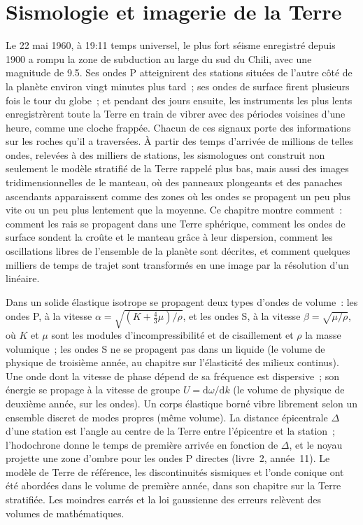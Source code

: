 \chapter{Sismologie et imagerie de la Terre}\label{ch:b3:seismology-imaging}

Le 22 mai 1960, à 19:11 temps universel, le plus fort séisme enregistré depuis
1900 a rompu la zone de subduction au large du sud du Chili, avec une magnitude de 9.5.
Ses ondes P atteignirent des stations situées de l'autre côté de la planète environ vingt minutes
plus tard~; ses ondes de surface firent plusieurs fois le tour du globe~; et pendant des jours
ensuite, les instruments les plus lents enregistrèrent toute la Terre en train de vibrer avec
des périodes voisines d'une heure, comme une cloche frappée. Chacun de ces signaux porte
des informations sur les roches qu'il a traversées. À partir des temps d'arrivée de millions de
telles ondes, relevées à des milliers de stations, les sismologues ont construit non seulement
le modèle stratifié de la Terre rappelé plus bas, mais aussi des images tridimensionnelles de
le manteau, où des panneaux plongeants et des panaches ascendants apparaissent comme des zones où
les ondes se propagent un peu plus vite ou un peu plus lentement que la moyenne. Ce chapitre montre comment~:
comment les rais se propagent dans une Terre sphérique, comment les ondes de surface sondent la croûte
et le manteau grâce à leur dispersion, comment les oscillations libres de l'ensemble de la
planète sont décrites, et comment quelques milliers de temps de trajet sont transformés en une
image par la résolution d'un  linéaire.

\begin{recall}
Dans un solide élastique isotrope se propagent deux types d'ondes de volume~: les ondes P, à la
vitesse $\alpha = \sqrt{(K + \tfrac43\mu)/\rho}$, et les ondes S, à la
vitesse $\beta = \sqrt{\mu/\rho}$, où $K$ et $\mu$ sont les modules d'incompressibilité et de cisaillement
et $\rho$ la masse volumique~; les ondes S ne se propagent pas dans un liquide (le volume de physique
de troisième année, au chapitre sur l'élasticité des milieux continus). Une onde dont la vitesse de phase
dépend de sa fréquence est dispersive~; son énergie se propage à la
vitesse de groupe $U = \mathrm d\omega/\mathrm dk$ (le volume de physique de deuxième année, sur les
ondes). Un corps élastique borné vibre librement selon un ensemble discret de modes
propres (même volume). La distance épicentrale $\Delta$ d'une station est l'angle
au centre de la Terre entre l'épicentre et la station~; l'hodochrone
donne le temps de première arrivée en fonction de $\Delta$, et le noyau projette une
zone d'ombre pour les ondes P directes (livre~2, année~11). Le modèle de Terre de référence,
les discontinuités sismiques et l'onde conique ont été abordées dans le volume de première année,
dans son chapitre sur la Terre stratifiée. Les moindres carrés et la loi gaussienne des
erreurs relèvent des volumes de mathématiques.
\end{recall}


